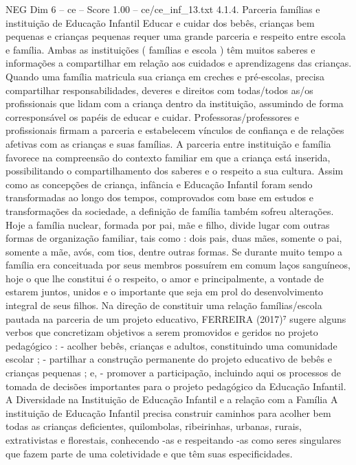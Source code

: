 \begin{textsample}{NEG Dim 6 – ce – Score 1.00 – ce/ce\_inf\_13.txt}  \label{ex:f6_neg_260}
4.1.4.
Parceria famílias e instituição de Educação Infantil Educar e cuidar dos bebês, crianças bem pequenas e crianças pequenas requer uma grande parceria e respeito entre escola e família.
Ambas as instituições ( famílias e escola ) têm muitos saberes e informações a compartilhar em relação aos cuidados e aprendizagens das crianças.
Quando uma família matricula sua criança em creches e pré-escolas, precisa compartilhar responsabilidades, deveres e direitos com todas/todos as/os profissionais que lidam com a criança dentro da instituição, assumindo de forma corresponsável os papéis de educar e cuidar.
Professoras/professores e profissionais firmam a parceria e estabelecem vínculos de confiança e de relações afetivas com as crianças e suas famílias.
A parceria entre instituição e família favorece na compreensão do contexto familiar em que a criança está inserida, possibilitando o compartilhamento dos saberes e o respeito a sua cultura.
Assim como as concepções de criança, infância e Educação Infantil foram sendo transformadas ao longo dos tempos, comprovados com base em estudos e transformações da sociedade, a definição de família também sofreu alterações.
Hoje a família nuclear, formada por pai, mãe e filho, divide lugar com outras formas de organização familiar, tais como : dois pais, duas mães, somente o pai, somente a mãe, avós, com tios, dentre outras formas.
Se durante muito tempo a família era conceituada por seus membros possuírem em comum laços sanguíneos, hoje o que lhe constitui é o respeito, o amor e principalmente, a vontade de estarem juntos, unidos e o importante que seja em prol do desenvolvimento integral de seus filhos.
Na direção de constituir uma relação famílias/escola pautada na parceria de um projeto educativo, FERREIRA (2017)⁷ sugere alguns verbos que concretizam objetivos a serem promovidos e geridos no projeto pedagógico : - acolher bebês, crianças e adultos, constituindo uma comunidade escolar ; - partilhar a construção permanente do projeto educativo de bebês e crianças pequenas ; e, - promover a participação, incluindo aqui os processos de tomada de decisões importantes para o projeto pedagógico da Educação Infantil.
A Diversidade na Instituição de Educação Infantil e a relação com a Família A instituição de Educação Infantil precisa construir caminhos para acolher bem todas as crianças deficientes, quilombolas, ribeirinhas, urbanas, rurais, extrativistas e florestais, conhecendo -as e respeitando -as como seres singulares que fazem parte de uma coletividade e que têm suas especificidades.

\end{textsample}
